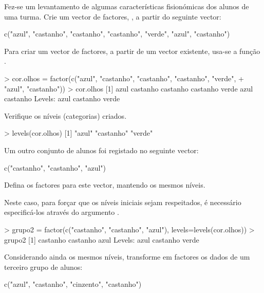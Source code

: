 \documentclass{exam}
\begin{document}
\begin{questions}
	
\question Fez-se um levantamento de algumas características fisionómicas dos alunos de uma turma. Crie um vector de factores, , a partir do seguinte vector:

\begin{rcode}
	c("azul", "castanho", "castanho", "castanho", "verde", "azul", "castanho")
\end{rcode}

\begin{solution}
	Para criar um vector de factores, a partir de um vector existente, usa-se a função .
		\begin{rcode}
			> cor.olhos = factor(c("azul", "castanho", "castanho", "castanho", "verde",
			+ "azul", "castanho"))
			> cor.olhos
			[1] azul     castanho castanho castanho verde    azul     castanho
			Levels: azul castanho verde
		\end{rcode}
\end{solution}

\question Verifique os níveis (categorias) criados.
\begin{solution}
	
	\begin{rcode}
		> levels(cor.olhos)
		[1] "azul"     "castanho" "verde"   
	\end{rcode}
\end{solution}

\question Um outro conjunto de alunos foi registado no seguinte vector:
\begin{rcode}
	c("castanho", "castanho", "azul")
\end{rcode}
Defina os factores para este vector, mantendo os mesmos níveis.

\begin{solution}
	Neste caso, para forçar que os níveis iniciais sejam respeitados, é necessário especificá-los através do argumento .
	\begin{rcode}
		> grupo2 = factor(c("castanho", "castanho", "azul"), levels=levels(cor.olhos))
		> grupo2
		[1] castanho castanho azul    
		Levels: azul castanho verde
	\end{rcode}
\end{solution}

\question Considerando ainda os mesmos níveis, transforme em factores os dados de um terceiro grupo de alunos:

\begin{rcode}
	c("azul", "castanho", "cinzento", "castanho")
\end{rcode}


\end{questions}
\end{document}
